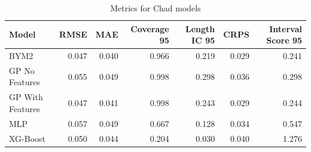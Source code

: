 \begin{table}
\caption{Metrics for Chad models}
\label{tcd-tab-models}
\begin{tabular}{lrrrrrr}
\toprule
Model & RMSE & MAE & Coverage 95 & Length IC 95 & CRPS & Interval Score 95 \\
\midrule
BYM2 & 0.047 & 0.040 & 0.966 & 0.219 & 0.029 & 0.241 \\
GP No Features & 0.055 & 0.049 & 0.998 & 0.298 & 0.036 & 0.298 \\
GP With Features & 0.047 & 0.041 & 0.998 & 0.243 & 0.029 & 0.244 \\
MLP & 0.057 & 0.049 & 0.667 & 0.128 & 0.034 & 0.547 \\
XG-Boost & 0.050 & 0.044 & 0.204 & 0.030 & 0.040 & 1.276 \\
\bottomrule
\end{tabular}
\end{table}

